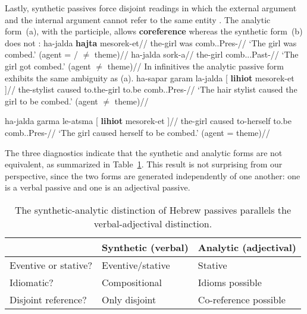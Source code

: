Lastly, synthetic passives force disjoint readings in which the external argument and the internal argument cannot refer to the same entity \citep{bakeretal89}. The analytic form~(\nextx a), with the participle, allows \textbf{coreference} whereas the synthetic form~(\nextx b) does not \citep[720]{sichel09}:
\pex \label{ex:disjoint}
    \a \begingl
        \gla {}ha-jalda \textbf{hajta} mesorek-et//
        \glb the-girl was comb..Pres-//
        \glft `The girl was combed.' (agent = / $\neq$ theme)//
        \endgl
    \a
        \begingl
        \gla {}ha-jalda sork-a//
        \glb the-girl comb...Past-//
        \glft `The girl got combed.' (agent $\neq$ theme)//
        \endgl
\xe
In infinitives the analytic passive form exhibits the same ambiguity as (\lastx a). 
\pex
	\a 	\begingl
	    \gla ha-sapar garam la-jalda [ \textbf{lihiot} mesorek-et ]//
	    \glb the-stylist caused to.the-girl to.be comb..Pres-//
	    \glft `The hair stylist caused the girl to be combed.' (agent $\neq$ theme)//
	    \endgl

	\a 	\begingl
	    \gla ha-jalda garma le-atsma [ \textbf{lihiot} mesorek-et ]//
	    \glb the-girl caused to-herself to.be comb..Pres-//
	    \glft `The girl caused herself to be combed.' (agent = theme)//
	    \endgl
\xe

The three diagnostics indicate that the synthetic and analytic forms are not equivalent, as summarized in Table~\ref{table:verbal-adjectival}. This result is not surprising from our perspective, since the two forms are generated independently of one another: one is a verbal passive and one is an adjectival passive.

\begin{table}[ht]
\centering
\begin{tabular}{l|ll}
 & Synthetic (verbal) & Analytic (adjectival) \\\hline
 Eventive or stative? & Eventive/stative  & Stative  \\
 Idiomatic? & Compositional  & Idioms possible  \\
 Disjoint reference? & Only disjoint & Co-reference possible  \\
\end{tabular}
\caption{The synthetic-analytic distinction of Hebrew passives parallels the verbal-adjectival distinction. \label{table:verbal-adjectival}}
\end{table}





